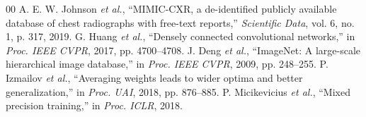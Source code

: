 \documentclass[conference]{IEEEtran}
\begin{document}
\begin{thebibliography}{00}
 A. E. W. Johnson \textit{et al.}, ``MIMIC-CXR, a de-identified publicly available database of chest radiographs with free-text reports,'' \textit{Scientific Data}, vol. 6, no. 1, p. 317, 2019.
 G. Huang \textit{et al.}, ``Densely connected convolutional networks,'' in \textit{Proc. IEEE CVPR}, 2017, pp. 4700--4708.
 J. Deng \textit{et al.}, ``ImageNet: A large-scale hierarchical image database,'' in \textit{Proc. IEEE CVPR}, 2009, pp. 248--255.
 P. Izmailov \textit{et al.}, ``Averaging weights leads to wider optima and better generalization,'' in \textit{Proc. UAI}, 2018, pp. 876--885.
 P. Micikevicius \textit{et al.}, ``Mixed precision training,'' in \textit{Proc. ICLR}, 2018.
\end{thebibliography}
\end{document}
